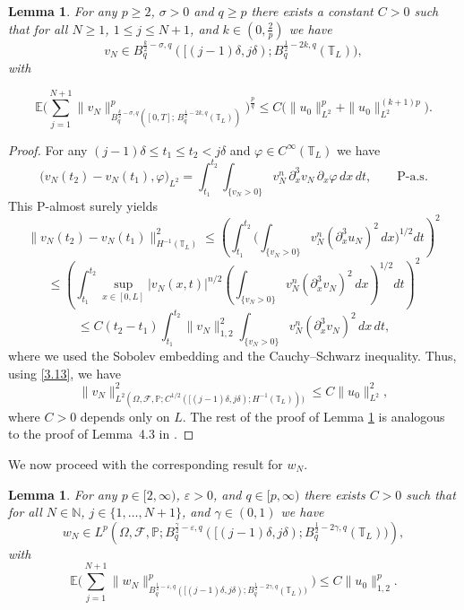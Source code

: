 \documentclass[a4paper,12pt]{article}
\newtheorem{lemma}[definition]{Lemma}
\numberwithin{equation}{section}
\newcommand{\ve}{{\varepsilon}}
\def\ve{\varepsilon}
\def\T{\mathbb{T}_L}
\begin{document}
\noindent
\begin{lemma}\label{lem:3.7}
For any $p \ge 2$, $\sigma>0$ and $q \ge p$ there exists
a constant $C>0$ such that for all $N \ge 1$, $1 \le j \le N+1$,
and $k \in (0,\tfrac{2}{p})$ we have
\[
v_N \in
B^{\frac{k}{2}-\sigma,q}_q([(j-1)\delta,j\delta);
B^{\frac12-2k,q}_q(\T)),
\]
with 

\[
\mathbb{E}\Bigg(
\sum_{j=1}^{N+1}
\|v_N\|_{B^{\frac{k}{2}-\sigma,q}_q([0,T];\, B^{\frac12-2k,q}_q(\mathbb{T}_L))}^p
\Bigg)^{\frac{p}{q}}
\le C\big(\|u_0\|_{L^2}^p + \|u_0\|_{L^2}^{(k+1)p}\big).
\]
\end{lemma}
\begin{proof}
For any $(j-1)\delta \le t_1 \le t_2 < j\delta$ and
$\varphi \in C^\infty(\mathbb{T}_L)$ we have
\[
\bigl(v_N(t_2)-v_N(t_1),\varphi\bigr)_{L^2}
=
\int_{t_1}^{t_2}
\int_{\{v_N>0\}}
v_N^n \,\partial_x^3 v_N \,\partial_x \varphi \, dx\, dt,
\qquad \text{P-a.s.}
\]
This P-almost surely yields
\[
\|v_N(t_2)-v_N(t_1)\|_{H^{-1}(\mathbb{T}_L)}^2
\le
\left(
\int_{t_1}^{t_2}
\Big(
\int_{\{v_N>0\}}
v_N^n (\partial_x^3 u_N)^2 \, dx
\Big)^{1/2}
dt
\right)^2
\]
\[
\le
\left(\int_{t_1}^{t_2}
\sup_{x\in[0,L]} |v_N(x,t)|^{n/2}
\left(
\int_{\{v_N>0\}}
v_N^n (\partial_x^3 v_N)^2 \, dx
\right)^{1/2} dt \right)^{2}
\]
\[
\le
C (t_2-t_1)
\int_{t_1}^{t_2}
\|v_N\|_{1,2}^2
\int_{\{v_N>0\}}
v_N^n (\partial_x^3 v_N)^2 \, dx \, dt,
\]
where we used the Sobolev embedding and the Cauchy--Schwarz inequality.
Thus, using \eqref{3.13}, we have
\[
\|v_N\|_{L^2(\Omega,\mathcal{F},\mathbb{P};
C^{1/2}([(j-1)\delta,j\delta); H^{-1}(\mathbb{T}_L)))}^2
\le
C \|u_0\|_{L^2}^2,
\]
where $C>0$ depends only on $L$.
The rest of the proof of Lemma \ref{lem:3.7} is analogous to the proof
of Lemma~4.3 in \cite{Gess1}.

\end{proof}

We now proceed with the corresponding result for $w_N$.

\begin{lemma}\label{lem:3.8}
    For any $p\in[2,\infty)$, $\ve>0$, and
$q\in[p,\infty)$ there exists $C>0$ such that for all
$N\in\mathbb{N}$, $j\in\{1,\dots,N+1\}$, and $\gamma \in(0,1)$ we have
\[
w_N \in
L^p\!\left(
\Omega,\mathcal{F},\mathbb{P};
B^{\frac{\gamma}{2}-\ve,q}_q([(j-1)\delta,j\delta);
B^{\frac12-2\gamma,q}_q(\mathbb{T}_L))
\right),
\]
with
\[
\mathbb{E}\Bigg(
\sum_{j=1}^{N+1}
\|w_N\|_{B^{\frac12-\ve,q}_q([(j-1)\delta,j\delta);
B^{\frac12-2\gamma,q}_q(\mathbb{T}_L))}^p
\Bigg)
\le
C \|u_0\|_{1,2}^p .
\]
\end{lemma}
\end{document}
